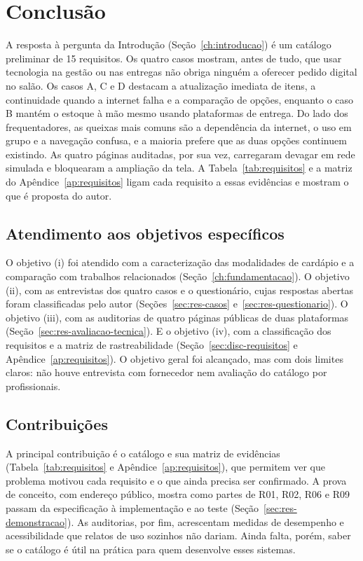\chapter{Conclusão}
\label{ch:conclusao}

A resposta à pergunta da Introdução (Seção~\ref{ch:introducao}) é um catálogo preliminar de 15 requisitos. Os quatro casos mostram, antes de tudo, que usar tecnologia na gestão ou nas entregas não obriga ninguém a oferecer pedido digital no salão. Os casos A, C e D destacam a atualização imediata de itens, a continuidade quando a internet falha e a comparação de opções, enquanto o caso B mantém o estoque à mão mesmo usando plataformas de entrega. Do lado dos frequentadores, as queixas mais comuns são a dependência da internet, o uso em grupo e a navegação confusa, e a maioria prefere que as duas opções continuem existindo. As quatro páginas auditadas, por sua vez, carregaram devagar em rede simulada e bloquearam a ampliação da tela. A Tabela~\ref{tab:requisitos} e a matriz do Apêndice~\ref{ap:requisitos} ligam cada requisito a essas evidências e mostram o que é proposta do autor.

\section{Atendimento aos objetivos específicos}
\label{sec:conc-objetivos}

O objetivo (i) foi atendido com a caracterização das modalidades de cardápio e a comparação com trabalhos relacionados (Seção~\ref{ch:fundamentacao}). O objetivo (ii), com as entrevistas dos quatro casos e o questionário, cujas respostas abertas foram classificadas pelo autor (Seções~\ref{sec:res-casos} e~\ref{sec:res-questionario}). O objetivo (iii), com as auditorias de quatro páginas públicas de duas plataformas (Seção~\ref{sec:res-avaliacao-tecnica}). E o objetivo (iv), com a classificação dos requisitos e a matriz de rastreabilidade (Seção~\ref{sec:disc-requisitos} e Apêndice~\ref{ap:requisitos}). O objetivo geral foi alcançado, mas com dois limites claros: não houve entrevista com fornecedor nem avaliação do catálogo por profissionais.

\section{Contribuições}
\label{sec:conc-contribuicoes}

A principal contribuição é o catálogo e sua matriz de evidências (Tabela~\ref{tab:requisitos} e Apêndice~\ref{ap:requisitos}), que permitem ver que problema motivou cada requisito e o que ainda precisa ser confirmado. A prova de conceito, com endereço público, mostra como partes de R01, R02, R06 e R09 passam da especificação à implementação e ao teste (Seção~\ref{sec:res-demonstracao}). As auditorias, por fim, acrescentam medidas de desempenho e acessibilidade que relatos de uso sozinhos não dariam. Ainda falta, porém, saber se o catálogo é útil na prática para quem desenvolve esses sistemas.

